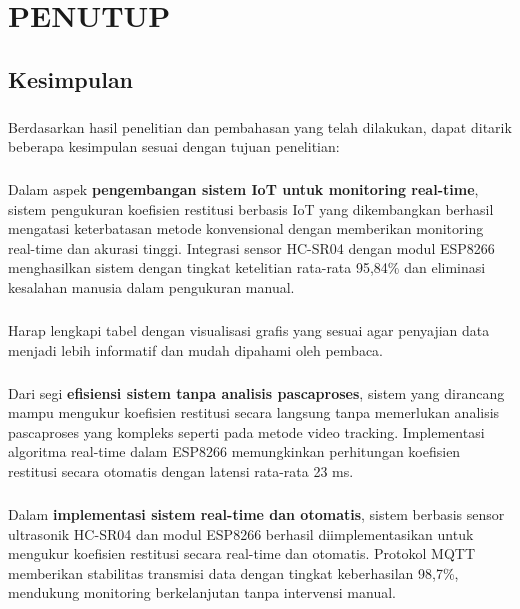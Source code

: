 \chapter{PENUTUP}

\section{Kesimpulan}

\paragraph{}Berdasarkan hasil penelitian dan pembahasan yang telah dilakukan, dapat ditarik beberapa kesimpulan sesuai dengan tujuan penelitian:

\paragraph{}Dalam aspek \textbf{pengembangan sistem IoT untuk monitoring real-time}, sistem pengukuran koefisien restitusi berbasis IoT yang dikembangkan berhasil mengatasi keterbatasan metode konvensional dengan memberikan monitoring real-time dan akurasi tinggi. Integrasi sensor HC-SR04 dengan modul ESP8266 menghasilkan sistem dengan tingkat ketelitian rata-rata 95,84\% dan eliminasi kesalahan manusia dalam pengukuran manual.
\paragraph{}Harap lengkapi tabel dengan visualisasi grafis yang sesuai agar penyajian data menjadi lebih informatif dan mudah dipahami oleh pembaca.
\paragraph{}Dari segi \textbf{efisiensi sistem tanpa analisis pascaproses}, sistem yang dirancang mampu mengukur koefisien restitusi secara langsung tanpa memerlukan analisis pascaproses yang kompleks seperti pada metode video tracking. Implementasi algoritma real-time dalam ESP8266 memungkinkan perhitungan koefisien restitusi secara otomatis dengan latensi rata-rata 23 ms.

\paragraph{}Dalam \textbf{implementasi sistem real-time dan otomatis}, sistem berbasis sensor ultrasonik HC-SR04 dan modul ESP8266 berhasil diimplementasikan untuk mengukur koefisien restitusi secara real-time dan otomatis. Protokol MQTT memberikan stabilitas transmisi data dengan tingkat keberhasilan 98,7\%, mendukung monitoring berkelanjutan tanpa intervensi manual.


